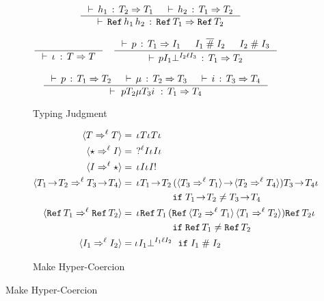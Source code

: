 \documentclass[acmtog, authorversion, acmlarge]{acmart}
\begin{document}
\begin{figure}[tbh]
\begin{subfigure}{.5\textwidth}
\begin{gather*}
      \quad
      \inference{\cwt{\HC_1}{\T_{2}}{\T_{1}} &
                 \cwt{\HC_2}{\T_{1}}{\T_{2}}}
                {\cwt{\rf{\HC_1}{\HC_2}}
                     {\Ref{\T_{1}}}
                     {\Ref{\T_{2}}}}
      \\[2ex]
      \inference{}{\cwt{\id}{\T}{\T}}
      \quad          
      \inference{\cwt{\Prj}{\T_1}{\I_1} &
                 \I_1 \sct \I_2 &
                 \I_2 \sic \I_3}
                {\cwt{\hcfail{\Prj}{\I_1}{\I_2}{\Lbl}{\I_3}}{\T_1}{\T_2}}
      \\[2ex]
      \inference{\cwt{\Prj}{\T_1}{\T_2} &
                 \cwt{\Med}{\T_2}{\T_3} &
                 \cwt{\Inj}{\T_3}{\T_4}}
                {\cwt{\hc{\Prj}{\T_2}{\Med}{\T_3}{\Inj}}{\T_1}{\T_4}}
    \end{gather*}
    \caption{Typing Judgment}
    \label{fig:hcTyping}
  \end{subfigure}%
  \begin{subfigure}{.5\textwidth}
    \begin{align*}
      \mkcrcn{\T}{\T} &= \hc{\pmt}{\T}{\id}{\T}{\imt} \\
      \mkcrcn{\Dyn}{\I} &= \; \hc{\prj{\Lbl}}{\I}{\id}{\I}{\imt} \\
      \mkcrcn{\I}{\Dyn} &= \hc{\pmt}{\I}{\id}{\I}{\inj} \\
      \mkcrcn{\Fn[\!]{\T_{1}}{\T_{2}}}{\Fn[\!]{\T_{3}}{\T_{4}}} &=
         \hc{\pmt}{\Fn[\!]{\T_{1}}{\T_{2}}}
            {(\fn[\!]{\mkcrcn{\T_{3}}{\T_{1}}}{\mkcrcn{\T_{2}}{\T_{4}}})} 
            {\Fn[\!]{\T_{3}}{\T_{4}}}{\imt} \\ 
            & \hspace{5.3em} \texttt{if} \; %
            \Fn[\!]{\T_{1}}{\T_{2}} \neq \Fn[\!]{\T_{3}}{\T_{4}} \\
      \mkcrcn{\Ref{\T_1}}{\Ref{\T_2}} &=
         \hc{\pmt}{\Ref{\T_{1}}}
            {(\rf{\mkcrcn{\T_{2}}{\T_{1}}}{\mkcrcn{\T_{1}}{\T_{2}}})} 
            {\Ref{\T_{2}}}{\imt} \\
            & \hspace{5.3em} \texttt{if} \; %
            \Ref{\T_1} \neq \Ref{\T_2} \\
      \mkcrcn{\I_1}{\I_2} &= \hcfail{\pmt}{\I_1}{\I_1}{\Lbl}{\I_2} %
      \hspace{.6em} \texttt{if} \; \I_1 \sic \I_2
    \end{align*}
    \caption{Make Hyper-Coercion}
    \label{fig:hcMakeCoercion}
  \end{subfigure}

\end{figure}
\end{document}
